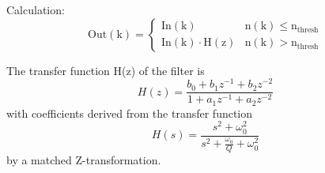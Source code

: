 %
%
%
%
%
%
%
%
Calculation:
\begin{equation*}%
    \mathrm{Out(k)}%
        =%
    \begin{cases}%
		\mathrm{In(k)} & \mathrm{n(k)} \le \mathrm{n_{thresh}}\\%
        \mathrm{In(k)} \cdot \mathrm{H(z)} & \mathrm{n(k)} > \mathrm{n_{thresh}}%
    \end{cases}%
\end{equation*}%

The transfer function H(z) of the filter is 
\begin{equation*}%
	H(z) = \frac{b_0 + b_1 z^{-1} + b_2 z^{-2}}{1 + a_1 z^{-1} + a_2 z^{-2}}
\end{equation*}%
with coefficients derived from the transfer function
\begin{equation*}%
	H(s) = \frac{s^2 + \omega_0^2}{s^2 + \frac{\omega_0}{Q} + \omega_0^2}
\end{equation*}%
by a matched Z-transformation.
